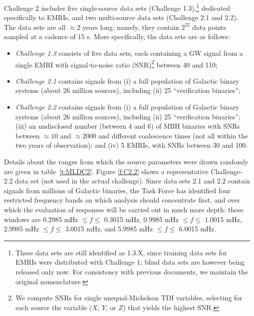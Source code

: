 \documentclass{iopart}
\begin{document}
Challenge 2 includes five single-source data sets (Challenge 1.3),\footnote{These data sets are still identified as 1.3.X, since training data sets for EMRIs were distributed with Challenge 1; blind data sets are however being released only now. For consistency with previous documents, we maintain the original nomenclature.} dedicated specifically to EMRIs, and two multi-source data sets (Challenge 2.1 and 2.2). The data sets are all $\approx 2$ years long: namely, they contain $2^{22}$ data points sampled at a cadence of 15 s. More specifically, the data sets are as follows: 
%
\begin{itemize}
\item \emph{Challenge 1.3} consists of five data sets, each containing a GW signal from a single EMRI with signal-to-noise ratio (SNR)\footnote{We compute SNRs for single unequal-Michelson TDI variables, selecting for each source the variable ($X$, $Y$, or $Z$) that yields the highest SNR.} between 40 and 110;
\item \emph{Challenge 2.1} contains signals from (i) a full population of Galactic binary systems (about 26 million sources), including (ii) 25 ``verification binaries'';
\item \emph{Challenge 2.2} contains signals from (i) a full population of Galactic binary systems (about 26 million sources), including (ii) 25 ``verification binaries''; (iii) an undisclosed number (between 4 and 6) of MBH binaries with SNRs between $\approx 10$ and $\approx 2000$ and different coalescence times (not all within the two years of observation); and (iv) 5 EMRIs, with SNRs between 30 and 100.
\end{itemize}
%
Details about the ranges from which the source parameters were drawn randomly are given in table~\ref{t:MLDC2}. Figure \ref{f:C2.2} shows a representative Challenge-2.2 data set (not used in the actual challenge). Since data sets 2.1 and 2.2 contain signals from millions of Galactic binaries, the Task Force has identified four restricted frequency bands on which analysis should concentrate first, and over which the evaluation of responses will be carried out in much more depth: these windows  are 0.2985 mHz $\le f \le$ 0.3015 mHz, 0.9985 mHz $\le f \le$ 1.0015 mHz, 2.9985 mHz $\le f \le$ 3.0015 mHz, and 5.9985 mHz $\le f \le$ 6.0015 mHz.  
%
\end{document}
